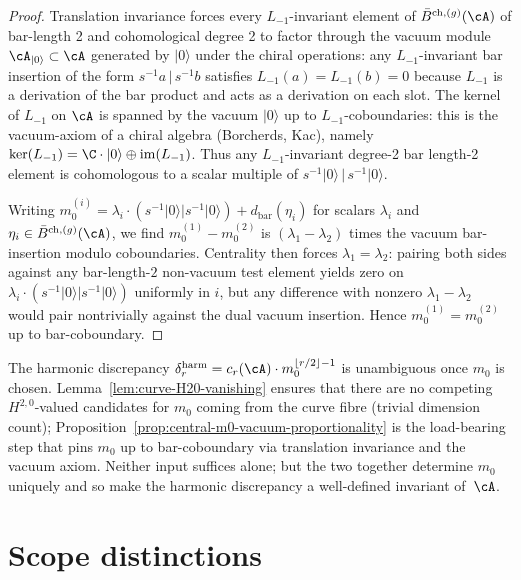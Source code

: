 \begin{proof}
Translation invariance forces every $L_{-1}$-invariant element of
$\bar B^{\mathrm{ch},(g)}(\cA)$ of bar-length 2 and cohomological
degree 2 to factor through the vacuum module $\cA_{|0\rangle} \subset
\cA$ generated by $|0\rangle$ under the chiral operations: any
$L_{-1}$-invariant bar insertion of the form
$s^{-1} a \,|\, s^{-1} b$ satisfies
$L_{-1}(a) = L_{-1}(b) = 0$ because $L_{-1}$ is a derivation of the bar
product and acts as a derivation on each slot. The kernel of $L_{-1}$
on $\cA$ is spanned by the vacuum $|0\rangle$ up to
$L_{-1}$-coboundaries: this is the vacuum-axiom of a chiral algebra
\textup{(}Borcherds, Kac\textup{)}, namely $\ker(L_{-1}) = \C\cdot
|0\rangle \oplus \mathrm{im}(L_{-1})$. Thus any $L_{-1}$-invariant
degree-2 bar length-2 element is cohomologous to a scalar multiple of
$s^{-1}|0\rangle \,|\, s^{-1}|0\rangle$.

Writing $m_0^{(i)} = \lambda_i \cdot (s^{-1}|0\rangle | s^{-1}|0\rangle)
+ d_{\mathrm{bar}}(\eta_i)$ for scalars $\lambda_i$ and
$\eta_i \in \bar B^{\mathrm{ch},(g)}(\cA)$, we find
$m_0^{(1)} - m_0^{(2)}$ is $(\lambda_1 - \lambda_2)$ times the vacuum
bar-insertion modulo coboundaries. Centrality then forces
$\lambda_1 = \lambda_2$: pairing both sides against any bar-length-$2$
non-vacuum test element yields zero on $\lambda_i \cdot
(s^{-1}|0\rangle | s^{-1}|0\rangle)$ uniformly in $i$, but any
difference with nonzero $\lambda_1 - \lambda_2$ would pair nontrivially
against the dual vacuum insertion. Hence $m_0^{(1)} = m_0^{(2)}$ up to
bar-coboundary.
\end{proof}

\begin{remark}
\label{rem:central-m0-sub-a-sub-b-combined}
The harmonic discrepancy
$\delta_r^{\mathrm{harm}} = c_r(\cA) \cdot m_0^{\lfloor r/2 \rfloor - 1}$
is unambiguous once $m_0$ is chosen. Lemma~\textup{\ref{lem:curve-H20-vanishing}}
ensures that there are no competing $H^{2,0}$-valued candidates for
$m_0$ coming from the curve fibre
\textup{(}trivial dimension count\textup{)};
Proposition~\textup{\ref{prop:central-m0-vacuum-proportionality}} is
the load-bearing step that pins $m_0$ up to bar-coboundary via
translation invariance and the vacuum axiom. Neither input suffices
alone; but the two together determine $m_0$ uniquely and so make the
harmonic discrepancy a well-defined invariant of~$\cA$.
\end{remark}

\section{Scope distinctions}
\label{sec:mc5-cache-entries}

